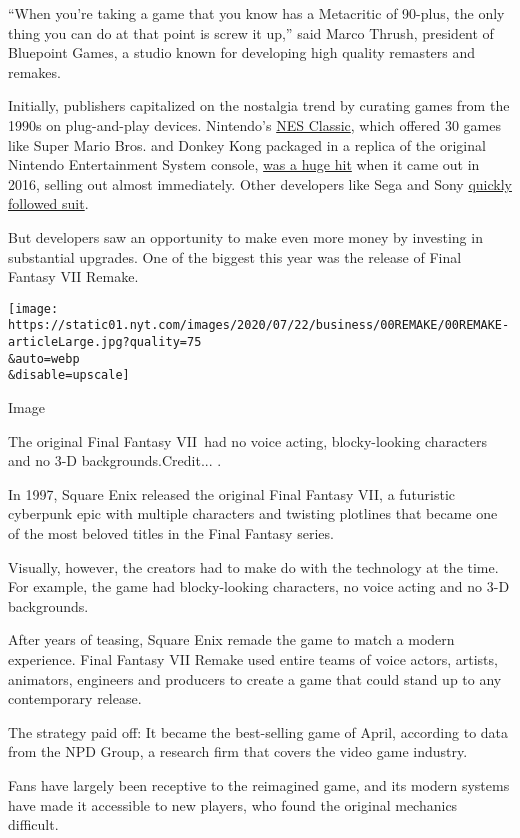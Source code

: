 ``When you're taking a game that you know has a Metacritic of 90-plus,
the only thing you can do at that point is screw it up,'' said Marco
Thrush, president of Bluepoint Games, a studio known for developing high
quality remasters and remakes.

Initially, publishers capitalized on the nostalgia trend by curating
games from the 1990s on plug-and-play devices. Nintendo's
\href{https://www.nytimes.com/2016/07/16/technology/nintendo-nes.html}{NES
Classic}, which offered 30 games like Super Mario Bros. and Donkey Kong
packaged in a replica of the original Nintendo Entertainment System
console,
\href{https://www.nytimes.com/2016/11/27/business/nintendos-new-console-may-feed-your-nostalgia-if-you-can-get-one.html}{was
a huge hit} when it came out in 2016, selling out almost immediately.
Other developers like Sega and Sony
\href{https://www.nytimes.com/2018/12/02/business/retro-video-games.html}{quickly
followed suit}.

But developers saw an opportunity to make even more money by investing
in substantial upgrades. One of the biggest this year was the release of
Final Fantasy VII Remake.

\texttt{[image: https://static01.nyt.com/images/2020/07/22/business/00REMAKE/00REMAKE-articleLarge.jpg?quality=75\\\&auto=webp\\\&disable=upscale]}

Image

The original Final Fantasy VII~had no voice acting, blocky-looking
characters and no 3-D backgrounds.Credit... .

In 1997, Square Enix released the original Final Fantasy VII, a
futuristic cyberpunk epic with multiple characters and twisting
plotlines that became one of the most beloved titles in the Final
Fantasy series.

Visually, however, the creators had to make do with the technology at
the time. For example, the game had blocky-looking characters, no voice
acting and no 3-D backgrounds.

After years of teasing, Square Enix remade the game to match a modern
experience. Final Fantasy VII Remake used entire teams of voice actors,
artists, animators, engineers and producers to create a game that could
stand up to any contemporary release.

The strategy paid off: It became the best-selling game of April,
according to data from the NPD Group, a research firm that covers the
video game industry.

Fans have largely been receptive to the reimagined game, and its modern
systems have made it accessible to new players, who found the original
mechanics difficult.

